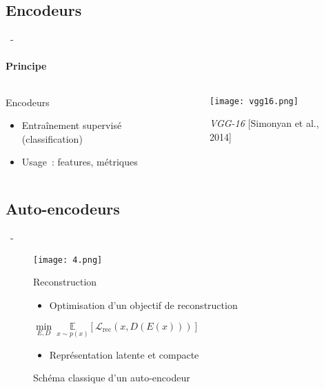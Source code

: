 \documentclass[aspectratio=169, 22pt]{beamer}
\begin{document}
\subsection{Encodeurs}
\begin{frame}{\secname~- \subsecname}
  \framesubtitle{Principe}
  \begin{columns}
    \begin{column}{0.4\linewidth}
      \begin{block}{Encodeurs}
        \begin{itemize}
        \item Entraînement supervisé (classification)
        \item Usage : features, métriques
        \end{itemize}
      \end{block}
    \end{column}
    \begin{column}{0.6\linewidth}
      \begin{figure}
        \centering
        \texttt{[image: vgg16.png]}
        \caption{\emph{VGG-16} [Simonyan et al., 2014]}
      \end{figure}
    \end{column}
  \end{columns}
\end{frame}

\subsection{Auto-encodeurs}
\begin{frame}{\secname~- \subsecname}
  \begin{figure}
    \centering
    \texttt{[image: 4.png]}
    \caption{Schéma classique d'un auto-encodeur}
    \begin{block}{Reconstruction}
      \centering
      \begin{itemize}        
      \item Optimisation d'un objectif de reconstruction
      \end{itemize}
      $\underset{E,D}{\min}\ \underset{x \sim p(x)}{\mathbb{E}}\left[\mathcal{L}_{\text{rec}}(x,D(E(x)))\right]$
      \begin{itemize}
      \item Représentation \alert{latente} et compacte
      \end{itemize}

    \end{block}
  \end{figure}
  
\end{frame}
\end{document}
